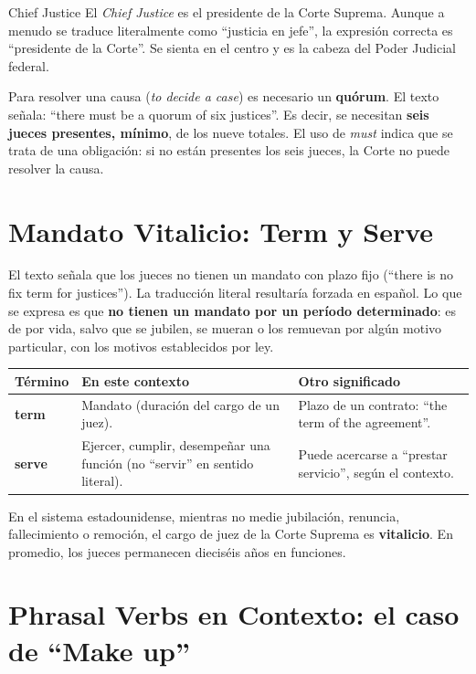 \documentclass[12pt,oneside]{book}
\begin{document}
\begin{definition}{Chief Justice}
El \textit{Chief Justice} es el presidente de la Corte Suprema. Aunque a menudo se traduce literalmente como ``justicia en jefe'', la expresión correcta es ``presidente de la Corte''. Se sienta en el centro y es la cabeza del Poder Judicial federal.
\end{definition}

Para resolver una causa (\textit{to decide a case}) es necesario un \textbf{quórum}. El texto señala: ``there must be a quorum of six justices''. Es decir, se necesitan \textbf{seis jueces presentes, mínimo}, de los nueve totales. El uso de \textit{must} indica que se trata de una obligación: si no están presentes los seis jueces, la Corte no puede resolver la causa.

\section{Mandato Vitalicio: Term y Serve}

El texto señala que los jueces no tienen un mandato con plazo fijo (``there is no fix term for justices''). La traducción literal resultaría forzada en español. Lo que se expresa es que \textbf{no tienen un mandato por un período determinado}: es de por vida, salvo que se jubilen, se mueran o los remuevan por algún motivo particular, con los motivos establecidos por ley.

\begin{table}[H]
\centering
\begin{tabularx}{\textwidth}{p{3cm} X p{3.5cm}}
\toprule
\textbf{Término} & \textbf{En este contexto} & \textbf{Otro significado} \\
\midrule
\textbf{term} & Mandato (duración del cargo de un juez). & Plazo de un contrato: ``the term of the agreement''. \\
\midrule
\textbf{serve} & Ejercer, cumplir, desempeñar una función (no ``servir'' en sentido literal). & Puede acercarse a ``prestar servicio'', según el contexto. \\
\bottomrule
\end{tabularx}
\end{table}

En el sistema estadounidense, mientras no medie jubilación, renuncia, fallecimiento o remoción, el cargo de juez de la Corte Suprema es \textbf{vitalicio}. En promedio, los jueces permanecen dieciséis años en funciones.

\section{Phrasal Verbs en Contexto: el caso de ``Make up''}
\end{document}

